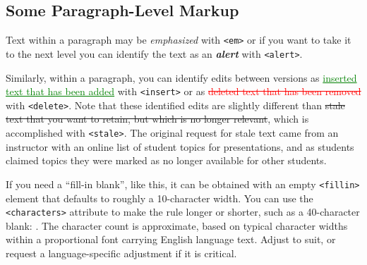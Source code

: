 \documentclass[10pt,]{article}
\newcommand{\alert}[1]{\textbf{\textit{#1}}}
\newcommand{\insertthick}{.1ex}
\newcommand{\inserted}[1]{\renewcommand{\ULthickness}{\insertthick}\textcolor{green}{\uline{#1}}}
\newcommand{\deletethick}{.25ex}
\newcommand{\deleted}[1]{\renewcommand{\ULthickness}{\deletethick}\textcolor{red}{\sout{#1}}}
\newcommand{\stalethick}{.1ex}
\newcommand{\stale}[1]{\renewcommand{\ULthickness}{\stalethick}\sout{#1}}
\newcommand{\fillin}[1]{\underline{\hspace{#1em}}}
\theoremstyle{plain}
\theoremstyle{definition}
\theoremstyle{definition}
\theoremstyle{definition}
\theoremstyle{definition}
\theoremstyle{definition}
\theoremstyle{definition}
\numberwithin{equation}{section}
\begin{document}
\subsection[{Some Paragraph-Level Markup}]{Some Paragraph-Level Markup}\label{subsection-paragraph-markup}
\hypertarget{p-140}{}%
Text within a paragraph may be \emph{emphasized} with \lstinline?<em>? or if you want to take it to the next level you can identify the text as an \alert{alert} with \lstinline?<alert>?.%
\par
\hypertarget{p-141}{}%
Similarly, within a paragraph, you can identify edits between versions as \inserted{inserted text that has been added} with \lstinline?<insert>? or as \deleted{deleted text that has been removed} with \lstinline?<delete>?.  Note that these identified edits are slightly different than \stale{stale text that you want to retain, but which is no longer relevant}, which is accomplished with \lstinline?<stale>?.  The original request for stale text came from an instructor with an online list of student topics for presentations, and as students claimed topics they were marked as no longer available for other students.%
\par
\hypertarget{p-142}{}%
If you need a ``fill-in blank'', like this\fillin{4.545454545454546}, it can be obtained with an empty \lstinline?<fillin>? element that defaults to roughly a 10-character width.  You can use the \lstinline?<characters>? attribute to make the rule longer or shorter, such as a 40-character blank: \fillin{18.1818181818182}.  The character count is approximate, based on typical character widths within a proportional font carrying English language text.  Adjust to suit, or request a language-specific adjustment if it is critical.%
\typeout{************************************************}
\typeout{************************************************}
\end{document}

